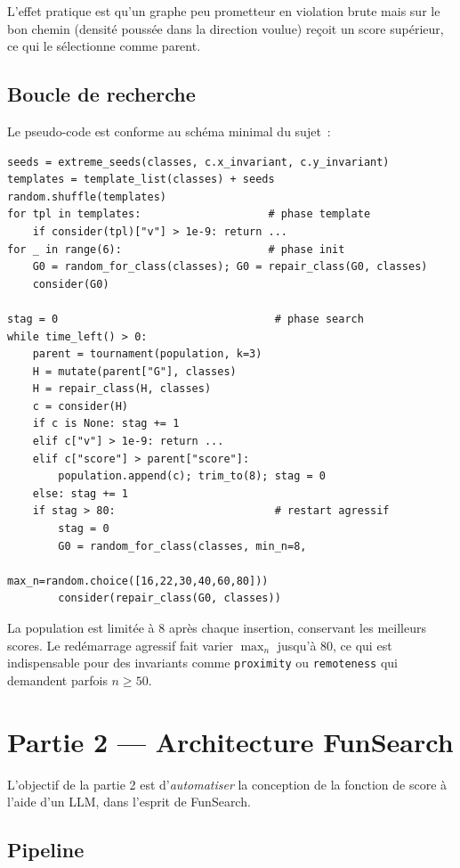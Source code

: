 \documentclass[11pt,a4paper]{article}
\begin{document}
L'effet pratique est qu'un graphe \og{}peu prometteur en violation
brute\fg{} mais \og{}sur le bon chemin\fg{} (densité poussée dans la direction
voulue) reçoit un score supérieur, ce qui le sélectionne comme parent.

\subsection{Boucle de recherche}

Le pseudo-code est conforme au schéma minimal du sujet~:
\begin{lstlisting}[style=py]
seeds = extreme_seeds(classes, c.x_invariant, c.y_invariant)
templates = template_list(classes) + seeds
random.shuffle(templates)
for tpl in templates:                    # phase template
    if consider(tpl)["v"] > 1e-9: return ...
for _ in range(6):                       # phase init
    G0 = random_for_class(classes); G0 = repair_class(G0, classes)
    consider(G0)

stag = 0                                  # phase search
while time_left() > 0:
    parent = tournament(population, k=3)
    H = mutate(parent["G"], classes)
    H = repair_class(H, classes)
    c = consider(H)
    if c is None: stag += 1
    elif c["v"] > 1e-9: return ...
    elif c["score"] > parent["score"]:
        population.append(c); trim_to(8); stag = 0
    else: stag += 1
    if stag > 80:                         # restart agressif
        stag = 0
        G0 = random_for_class(classes, min_n=8,
                              max_n=random.choice([16,22,30,40,60,80]))
        consider(repair_class(G0, classes))
\end{lstlisting}
La population est limitée à $8$ après chaque insertion, conservant les
meilleurs scores. Le redémarrage agressif fait varier $\max_n$ jusqu'à $80$,
ce qui est indispensable pour des invariants comme \texttt{proximity} ou
\texttt{remoteness} qui demandent parfois $n \ge 50$.

\section{Partie 2 — Architecture FunSearch}

L'objectif de la partie 2 est d'\emph{automatiser} la conception de la
fonction de score à l'aide d'un LLM, dans l'esprit de FunSearch.

\subsection{Pipeline}
\end{document}
